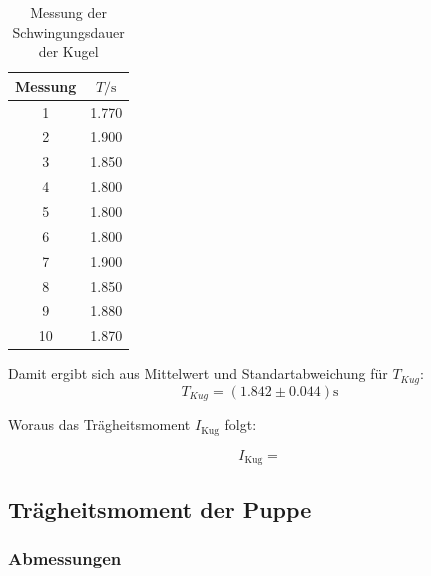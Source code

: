 \begin{table}[H]
  \centering
  \caption{Messung der Schwingungsdauer der Kugel}
  \label{tab:SchwingungsdauerKugel}
  \begin{tabular}{c c}
    \toprule
    Messung &  $T / \unit\second$ \\
    \midrule
              1 &        1.770 \\
              2 &        1.900 \\
              3 &        1.850 \\
              4 &        1.800 \\
              5 &        1.800 \\
              6 &        1.800 \\
              7 &        1.900 \\
              8 &        1.850 \\
              9 &        1.880 \\
             10 &        1.870 \\
    \bottomrule
    \end{tabular}
\end{table}

Damit ergibt sich aus Mittelwert und Standartabweichung für $T_{Kug}$:
\begin{equation*}
  T_{Kug} = (1.842 \pm 0.044) \unit\second
\end{equation*}

Woraus das Trägheitsmoment $I_{\text{Kug}}$ folgt:



\begin{equation*}
  I_{\text{Kug}} = 
\end{equation*}



\subsection{Trägheitsmoment der Puppe}

\subsubsection{Abmessungen}

